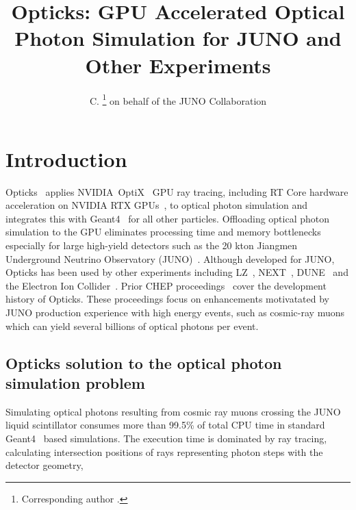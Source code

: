 \documentclass{webofc}
\begin{document}
\title{Opticks: GPU Accelerated Optical Photon Simulation for JUNO and Other Experiments}
\author{ C. \fnsep\thanks{Corresponding author .} on behalf of the JUNO Collaboration}
\abstract{}
\maketitle
%
%
\section{Introduction}%
\label{intro}
%
Opticks~\cite{opticks,chep2024,chep2023,chep2021,chep2019,chep2018,chep2016} applies NVIDIA\textregistered\ OptiX\texttrademark~\cite{optix} GPU ray tracing, including RT Core 
hardware acceleration on NVIDIA RTX GPUs~\cite{rtx}, to optical photon simulation and integrates this with Geant4~\cite{g4} for all other particles.
Offloading optical photon simulation to the GPU eliminates processing time and memory bottlenecks especially for
large high-yield detectors such as the 20 kton Jiangmen Underground Neutrino Observatory (JUNO)~\cite{juno}. 
Although developed for JUNO, Opticks has been used by other experiments including LZ~\cite{lz}, NEXT~\cite{next}, DUNE~\cite{dune}
and the Electron Ion Collider~\cite{eic}. Prior CHEP proceedings~\cite{chep2024,chep2023,chep2021,chep2019,chep2018,chep2016} cover the development history of Opticks.
These proceedings focus on enhancements motivatated by JUNO production experience with high energy events, such as cosmic-ray muons which can yield several billions
of optical photons per event.
%
%
\newpage
\subsection{Opticks solution to the optical photon simulation problem}
Simulating optical photons resulting from cosmic ray muons crossing the JUNO liquid scintillator consumes
more than 99.5\% of total CPU time in standard Geant4~\cite{g4} based simulations. The execution time is dominated by 
ray tracing, calculating intersection positions of rays representing photon steps with the detector geometry,
\end{document}
